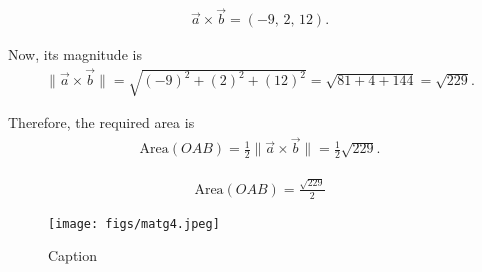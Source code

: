 \documentclass[journal]{IEEEtran}
\begin{document}
\begin{align}
\vec{a} \times \vec{b} = (-9,\, 2,\, 12).
\end{align}

Now, its magnitude is
\begin{align}
\|\vec{a} \times \vec{b}\| = \sqrt{(-9)^2 + (2)^2 + (12)^2}
= \sqrt{81 + 4 + 144} = \sqrt{229}.
\end{align}

Therefore, the required area is
\begin{align}
\text{Area}(OAB) = \frac{1}{2}\|\vec{a} \times \vec{b}\|
= \frac{1}{2}\sqrt{229}.
\end{align}

\begin{align}
\boxed{\text{Area}(OAB) = \frac{\sqrt{229}}{2}}
\end{align}
\begin{figure}[h!]
    \centering
    \texttt{[image: figs/matg4.jpeg]}
    \caption{Caption}
    \label{fig:placeholder}
\end{figure}
\end{document}
